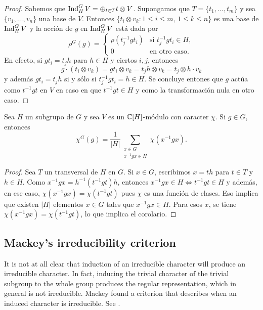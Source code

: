 \begin{proof}
    Sabemos que $\operatorname{Ind}_H^GV=\oplus_{t\in T}t\otimes V$. 
    Supongamos que $T=\{t_1,\dots,t_m\}$ 
    y sea $\{v_1,\dots,v_n\}$ una base de $V$. 
    Entonces $\{t_i\otimes v_k:1\leq i\leq m,\,1\leq k\leq n\}$ es 
    una base de $\operatorname{Ind}_H^GV$ y la acción
    de $g$ en $\operatorname{Ind}_H^GV$ está dada por
    \[
    \rho^G(g)=\begin{cases}
    \rho(t_j^{-1}gt_i) & \text{si $t_j^{-1}gt_i\in H$},\\
    0 & \text{en otro caso}.
    \end{cases}
    \]
    En efecto, si $gt_i=t_jh$ para $h\in H$ y ciertos $i,j$, entonces 
    \[
    g\cdot (t_i\otimes v_k)=gt_i\otimes v_k=t_jh\otimes v_k=t_j\otimes h\cdot v_k
    \]
    y además $gt_i=t_jh$ si y sólo si $t_j^{-1}gt_i=h\in H$. Se concluye entones
    que $g$ actúa como $t^{-1}gt$ en $V$ en caso en que $t^{-1}gt\in H$ y 
    como la transformación nula en otro caso. 
\end{proof}

\begin{corollary}
\label{cor:induccion}
    Sea $H$ un subgrupo de $G$ 
    y sea $V$ es un $\mathbb{C}[H]$-módulo con caracter $\chi$.
    Si $g\in G$, entonces
    \[
    \chi^G(g)=\frac{1}{|H|}\sum_{\substack{x\in G\\x^{-1}gx\in H}}\chi(x^{-1}gx).
    \]
\end{corollary}

\begin{proof}
    Sea $T$ un transversal de $H$ en $G$. Si $x\in G$, escribimos $x=th$ para $t\in T$ y $h\in H$. 
    Como $x^{-1}gx=h^{-1}(t^{-1}gt)h$, entonces $x^{-1}gx\in H\Longleftrightarrow t^{-1}gt\in H$ y además, en ese caso, 
    $\chi(x^{-1}gx)=\chi(t^{-1}gt)$ pues $\chi$ es una función de clases. Eso implica que existen $|H|$ elementos $x\in G$ 
    tales que $x^{-1}gx\in H$. Para esos $x$, se tiene $\chi(x^{-1}gx)=\chi(t^{-1}gt)$, lo que implica 
    el corolario. 
\end{proof}


\subsection*{Mackey's irreducibility criterion}

It is not at all clear that 
induction of an irreducible character will produce an irreducible character. In fact, 
inducing the trivial character of the trivial subgroup to the whole group produces the 
regular representation, which in general is not irreducible. Mackey found a criterion 
that describes when an induced character is irreducible. See \cite[\S8.3]{MR2867444}. 

